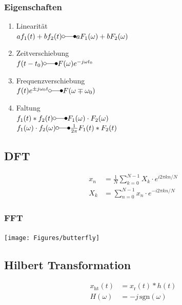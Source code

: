 \documentclass[10pt,a4paper]{article}
\begin{document}
  \subsubsection{Eigenschaften}
  \begin{mdframed}[style=exercise]
    \begin{enumerate}
      \item Linearität\\
      $a f_1(t) + b f_2(t) \laplace a F_1(\omega) + b F_2(\omega)$
      \item Zeitverschiebung\\
      $f(t-t_0) \laplace F(\omega)e^{-j\omega t_0}$
      \item Frequenzverschiebung\\
      $f(t) e^{\pm j\omega_0 t}\laplace F(\omega\mp \omega_0)$
      \item Faltung\\
      $f_1(t)*f_2(t)\laplace F_1(\omega)\cdot F_2(\omega)$\\
      $f_1(\omega)\cdot f_2(\omega)\laplace \frac{1}{2\pi}F_1(t)*F_2(t)$
    \end{enumerate}
  \end{mdframed}
  \subsection{DFT}
  \begin{mdframed}[style=exercise]
    \begin{align}
      x_n &= \frac{1}{N} \sum_{k=0}^{N-1} X_k\cdot e^{i 2 \pi k n / N}\\
      X_k &= \sum_{n=0}^{N-1} x_n\cdot e^{-i 2 \pi k n / N}
    \end{align}
  \end{mdframed}
  \subsubsection{FFT}
  \begin{center}
    \texttt{[image: Figures/butterfly]}
  \end{center}
  \pagebreak
  \subsection{Hilbert Transformation}
  \begin{mdframed}[style=exercise]
    \begin{align}
      x_{\mathrm{ht}}(t) &= x_{\mathrm{r}}(t) * h(t)\\
      H(\omega) &= -j \, \text{sgn}(\omega)
    \end{align}
  \end{mdframed}
\end{document}
